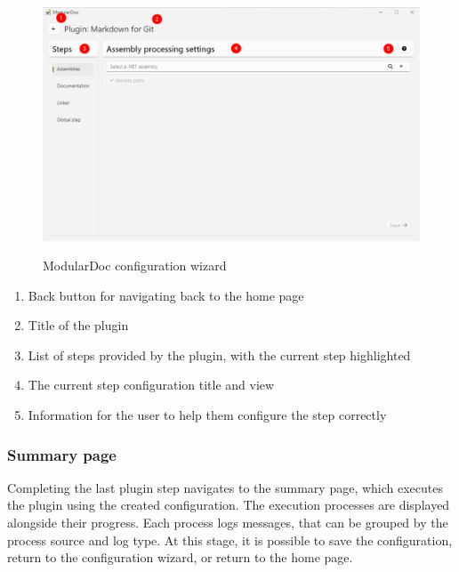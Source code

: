 \begin{figure}[H]
    \includegraphics[width=\linewidth]{img/modularDocConfigurator.png}
    \label{fig:modularDocconfiguratorPage}
    \caption{ModularDoc configuration wizard}
\end{figure}

\begin{enumerate}
    \item Back button for navigating back to the home page
    \item Title of the plugin
    \item List of steps provided by the plugin, with the current step highlighted
    \item The current step configuration title and view
    \item Information for the user to help them configure the step correctly
\end{enumerate}

\pagebreak
\subsubsection{Summary page}

Completing the last plugin step navigates to the summary page, which executes the plugin using the created configuration. The execution processes are displayed alongside their progress. Each process logs messages, that can be grouped by the process source and log type. At this stage, it is possible to save the configuration, return to the configuration wizard, or return to the home page.

